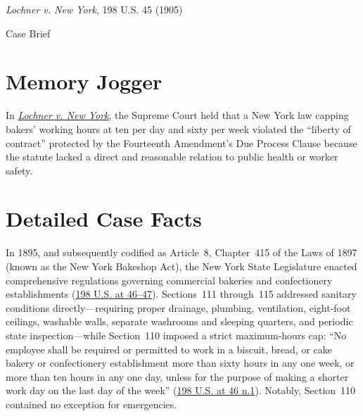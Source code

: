 \documentclass[12pt]{article}
\begin{document}
\begin{center}
{\LARGE \textit{Lochner v. New York}, 198 U.S. 45 (1905)\par}
\vspace{0.8em}
{\large Case Brief\par}
\end{center}
\vspace{1em}

\section{Memory Jogger}

In \href{https://www.courtlistener.com/opinion/96276/lochner-v-new-york/}{\textit{Lochner v. New York}}, the Supreme Court held that a New York law capping bakers' working hours at ten per day and sixty per week violated the ``liberty of contract'' protected by the Fourteenth Amendment's Due Process Clause because the statute lacked a direct and reasonable relation to public health or worker safety.

\section{Detailed Case Facts}

In 1895, and subsequently codified as Article~8, Chapter~415 of the Laws of 1897 (known as the New York Bakeshop Act), the New York State Legislature enacted comprehensive regulations governing commercial bakeries and confectionery establishments (\href{https://caselaw.findlaw.com/court/us-supreme-court/198/45.html}{198 U.S. at 46--47}). Sections~111 through~115 addressed sanitary conditions directly---requiring proper drainage, plumbing, ventilation, eight-foot ceilings, washable walls, separate washrooms and sleeping quarters, and periodic state inspection---while Section~110 imposed a strict maximum-hours cap: ``No employee shall be required or permitted to work in a biscuit, bread, or cake bakery or confectionery establishment more than sixty hours in any one week, or more than ten hours in any one day, unless for the purpose of making a shorter work day on the last day of the week'' (\href{https://caselaw.findlaw.com/court/us-supreme-court/198/45.html}{198 U.S. at 46 n.1}). Notably, Section~110 contained no exception for emergencies.
\end{document}
